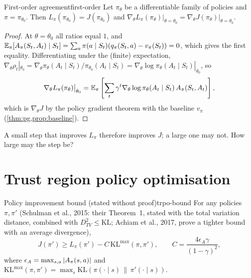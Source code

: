 \begin{proposition}{First-order agreement}{first-order}
  Let $\pi_\theta$ be a differentiable family of policies and $\pi =
  \pi_{\theta_0}$. Then $L_\pi(\pi_{\theta_0}) = J(\pi_{\theta_0})$ and
  $\nabla_\theta L_\pi(\pi_\theta) \big|_{\theta = \theta_0} =
  \nabla_\theta J(\pi_\theta) \big|_{\theta = \theta_0}$.
\end{proposition}

\begin{proof}
  At $\theta = \theta_0$ all ratios equal $1$, and $\mathbb{E}_\pi[A_\pi(S_t,
  A_t) \mid S_t] = \sum_a \pi(a \mid S_t) (q_\pi(S_t, a) - v_\pi(S_t)) =
  0$, which gives the first equality. Differentiating under the
  (finite) expectation, $\nabla_\theta \rho_t |_{\theta_0} = \nabla_\theta
  \pi_\theta(A_t \mid S_t) / \pi_{\theta_0}(A_t \mid S_t) = \nabla_\theta
  \log \pi_\theta(A_t \mid S_t) |_{\theta_0}$, so
  \begin{equation*}
    \nabla_\theta L_\pi(\pi_\theta) \big|_{\theta_0} = \mathbb{E}_\pi\left[\sum_t
    \gamma^t \nabla_\theta \log \pi_\theta(A_t \mid S_t)\, A_\pi(S_t, A_t)
    \right],
  \end{equation*}
  which is $\nabla_\theta J$ by the policy gradient theorem with the
  baseline $v_\pi$ (\cref{thm:pg,prop:baseline}).
\end{proof}

A small step that improves $L_\pi$ therefore improves $J$; a large one may
not. How large may the step be?

\section{Trust region policy optimisation}

\begin{theorem}{Policy improvement bound (stated without proof)}{trpo-bound}
  For any policies $\pi, \pi'$ (Schulman et al., 2015: their Theorem~1,
  stated with the total variation distance, combined with $D_{TV}^2 \le
  \mathrm{KL}$; Achiam et al., 2017, prove a tighter bound with an average
  divergence),
  \begin{equation}
    \label{eq:trpo-bound}
    J(\pi') \geq L_\pi(\pi') - C\, \mathrm{KL}^{\max}(\pi, \pi'), \qquad
    C = \frac{4 \epsilon_A \gamma}{(1 - \gamma)^2},
  \end{equation}
  where $\epsilon_A = \max_{s, a} \left\lvert A_\pi(s, a) \right\rvert$ and
  $\mathrm{KL}^{\max}(\pi, \pi') = \max_s \mathrm{KL}(\pi(\cdot \mid s)
  \,\|\, \pi'(\cdot \mid s))$.
\end{theorem}

